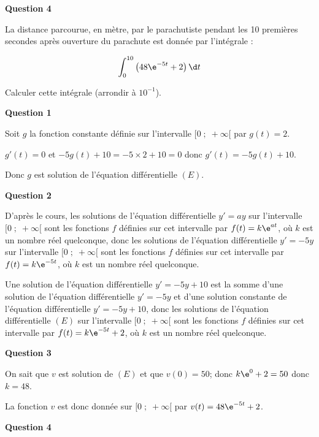 \documentclass[a4paper,11pt,exos]{nsi}
\begin{document}
\begin{flushleft}
\textbf{Question 4}
\end{flushleft}

La distance parcourue, en mètre, par le parachutiste pendant les 10 premières secondes après ouverture du parachute est donnée  par l'intégrale :

\[\displaystyle\int_{0}^{10} \left ( 48 \e^{-5t} +2 \right ) \d t\]

Calculer cette intégrale (arrondir à $10^{-1}$).

\begin{flushleft}
\textbf{Question 1}
\end{flushleft}

Soit $g$ la fonction constante définie sur l'intervalle $[0\;;\;+\infty[$ par $g(t)=2$.

$g'(t)=0$ et $-5g(t)+10=-5\times 2 +10=0$ donc $g'(t)=-5g(t)+10$.

Donc $g$ est solution de l'équation différentielle $(E)$.

\begin{flushleft}
\textbf{Question 2}
\end{flushleft}

D'après le cours, les solutions de l'équation différentielle $y'=ay$ sur l'intervalle $[0\;;\;+\infty[$ sont les fonctions $f$ définies sur cet intervalle par $f(t)=k\e^{at}$,  où $k$ est un nombre réel quelconque, donc les solutions de l'équation différentielle $y'=-5y$ sur l'intervalle $[0\;;\;+\infty[$ sont les fonctions $f$ définies sur cet intervalle par $f(t)=k\e^{-5t}$,  où $k$ est un nombre réel quelconque.

Une solution de l'équation différentielle $y'=-5y+10$ est la somme d'une solution de l'équation différentielle $y'=-5y$ et d'une solution constante de l'équation différentielle $y'=-5y+10$, donc les solutions de l'équation différentielle $(E)$ sur l'intervalle $[0\;;\;+\infty[$ sont les fonctions $f$ définies sur cet intervalle par $f(t)=k\e^{-5t}+2$,  où $k$ est un nombre réel quelconque.

\begin{flushleft}
\textbf{Question 3}
\end{flushleft}

On sait que $v$ est solution de $(E)$ et que $v(0)=50$; donc $k\e^{0}+2 = 50$ donc $k=48$.

La fonction $v$ est donc donnée sur $[0\;;\;+\infty[$ par $v(t) = 48 \e^{-5t} + 2$.

\begin{flushleft}
\textbf{Question 4}
\end{flushleft}
\end{document}
